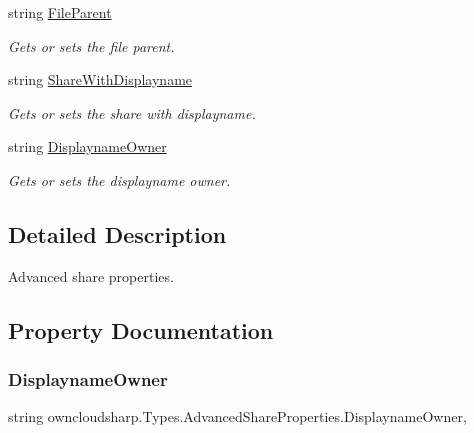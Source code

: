 \begin{DoxyCompactItemize}
string \hyperlink{classowncloudsharp_1_1_types_1_1_advanced_share_properties_a2c4e5bdae35155b9bce9f0aa02ca0de2}{File\+Parent}
\begin{DoxyCompactList}\small\item\em Gets or sets the file parent. \end{DoxyCompactList}\item 
string \hyperlink{classowncloudsharp_1_1_types_1_1_advanced_share_properties_a4fdad7e38248634f5ccb65f0afcd7908}{Share\+With\+Displayname}
\begin{DoxyCompactList}\small\item\em Gets or sets the share with displayname. \end{DoxyCompactList}\item 
string \hyperlink{classowncloudsharp_1_1_types_1_1_advanced_share_properties_add275aead35226f84b36e447e4104f0d}{Displayname\+Owner}
\begin{DoxyCompactList}\small\item\em Gets or sets the displayname owner. \end{DoxyCompactList}\end{DoxyCompactItemize}


\subsection{Detailed Description}
Advanced share properties. 



\subsection{Property Documentation}
\mbox{\label{classowncloudsharp_1_1_types_1_1_advanced_share_properties_add275aead35226f84b36e447e4104f0d}} 
\subsubsection{\texorpdfstring{Displayname\+Owner}{DisplaynameOwner}}
{\footnotesize\ttfamily string owncloudsharp.\+Types.\+Advanced\+Share\+Properties.\+Displayname\+Owner\hspace{0.3cm}{\ttfamily [get]}, {\ttfamily [set]}}



